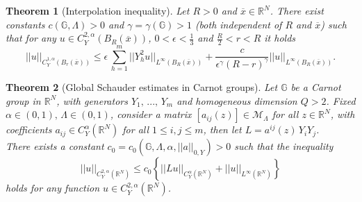 \documentclass[10pt,a4paper]{amsart}
\newtheorem{theorem}{Theorem}
\begin{document}
\begin{theorem}[Interpolation inequality]
    \label{Real interp ineq thm}
    Let $R>0$ and $\overline{x} \in \mathbb{R}^N$. There exist constants $c(\mathbb{G}, \Lambda)>0$ and $\gamma=\gamma(\mathbb{G})>1$ (both independent of $R$ and $\overline{x}$) such that for any $u \in C^{2,\alpha}_Y(B_R(\overline{x}))$, $0 < \epsilon < \frac{1}{3}$ and $\frac{R}{2}<r<R$ it holds
    \begin{equation*}
        ||u||_{C^{1,\alpha}_Y(B_r(\overline{x}))} \leq \epsilon \, \sum_{h=1}^m ||Y_h^2 u||_{L^{\infty}(B_R(\overline{x}))} + \frac{c}{\epsilon^\gamma (R-r)^{\gamma}} ||u||_{L^{\infty}(B_R(\overline{x}))}.
    \end{equation*}
\end{theorem}

\begin{theorem}[Global Schauder estimates in Carnot groups]
\label{1.4: Schauder est Carnot thm}
    Let $\mathbb{G}$ be a Carnot group in $\mathbb{R}^N$, with generators $Y_1, \, ..., \, Y_m$ and homogeneous dimension $Q>2$. Fixed $\alpha \in (0,1), \, \Lambda \in (0,1)$, consider a matrix $[a_{ij}(z)] \in \mathcal{M}_{\Lambda}$ for all $z \in \mathbb{R}^N$, with coefficients $a_{ij} \in C^{\alpha}_Y(\mathbb{R}^N)$ for all $1 \leq i,j \leq m$, then let $L = a^{ij}(z) \, Y_i Y_j$.
    \\
    There exists a constant $c_0=c_0(\mathbb{G}, \Lambda, \alpha, ||a||_{0,Y})>0$ such that the inequality
    \begin{equation}
    \label{Schauder est Carnot eqn}
        ||u||_{C^{2,\alpha}_Y(\mathbb{R}^N)} \leq c_0 \left\{ ||L u||_{C^{\alpha}_Y(\mathbb{R}^N)} + ||u||_{L^{\infty}(\mathbb{R}^N)} \right\}
    \end{equation}
    holds for any function $u \in C^{2,\alpha}_Y(\mathbb{R}^N)$.
\end{theorem}
\end{document}
